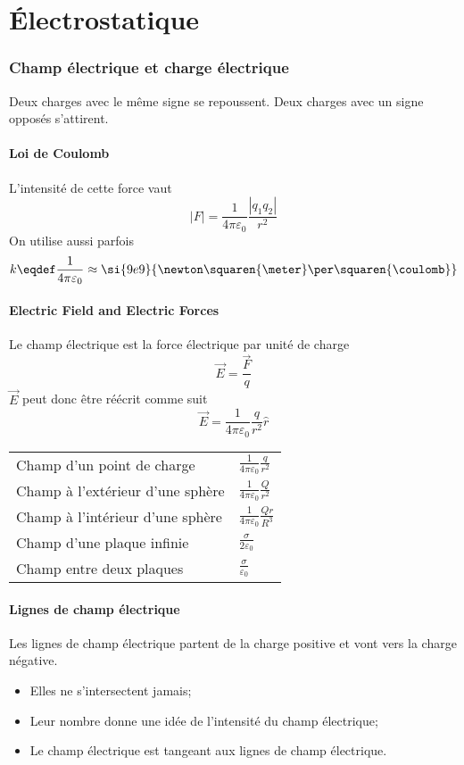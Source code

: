

\usepackage{array}
\usepackage{fancybox}
\usepackage{float}
\usepackage{colortbl}
\usepackage{makecell}
\usepackage{graphicx}
\usepackage{titlesec}
\usepackage{qtree}
\usepackage{tensor}
\usepackage{circuitikz}


\part{Électrostatique}
\section{Champ électrique et charge électrique}
Deux charges avec le même signe se repoussent.
Deux charges avec un signe opposés s'attirent.

\subsection{Loi de Coulomb}
L'intensité de cette force vaut
\[ |F| = \frac{1}{4\pi\varepsilon_0}\frac{|q_1q_2|}{r^2} \]
On utilise aussi parfois
\[ k \eqdef \frac{1}{4\pi\varepsilon_0} \approx
\si{9e9}{\newton\squaren{\meter}\per\squaren{\coulomb}} \]
\subsection{Electric Field and Electric Forces}
Le champ électrique est la force électrique par unité de charge
\[ \vec{E} = \frac{\vec{F}}{q} \]
$\vec{E}$ peut donc être réécrit comme suit
\[ \vec{E} = \frac{1}{4\pi\varepsilon_0}\frac{q}{r^2}\hat{r} \]
\begin{tabular}{ll}
	Champ d'un point de charge & \(\frac{1}{4\pi\varepsilon_0}\frac{q}{r^2}\)\\
	Champ à  l'extérieur d'une sphère & \(\frac{1}{4\pi\varepsilon_0}\frac{Q}{r^2}\)\\
	Champ à  l'intérieur d'une sphère & \(\frac{1}{4\pi\varepsilon_0}\frac{Qr}{R^3}\)\\
	Champ d'une plaque infinie & \(\frac{\sigma}{2\varepsilon_0}\)\\
	Champ entre deux plaques & \(\frac{\sigma}{\varepsilon_0}\)
\end{tabular}
\subsection{Lignes de champ électrique}
Les lignes de champ électrique partent de la charge positive et vont vers la charge négative.
\begin{itemize}
	\item Elles ne s'intersectent jamais;
	\item Leur nombre donne une idée de l'intensité du champ électrique;
	\item Le champ électrique est tangeant aux lignes de champ électrique.
\end{itemize}

